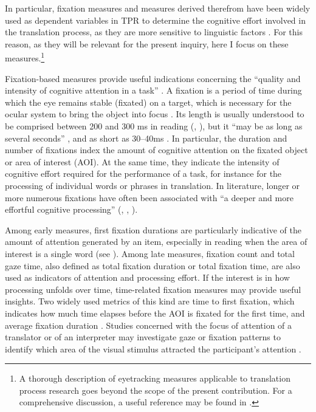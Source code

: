 In particular, fixation measures and measures derived therefrom have been widely used as dependent variables in TPR to determine the cognitive effort involved in the translation process, as they are more sensitive to linguistic factors \citep{gaskell_eye_2007}. For this reason, as they will be relevant for the present inquiry, here I focus on these measures.\footnote{A thorough description of eyetracking measures applicable to translation process research goes beyond the scope of the present contribution. For a comprehensive discussion, a useful reference may be found in \citet{conklin_eye-tracking_2018}.}

Fixation-based measures provide useful indications concerning the ``quality and intensity of cognitive attention in a task'' \citep[402]{jakobsen_translation_2020}. A fixation is a period of time during which the eye remains stable (fixated) on a target, which is necessary for the ocular system to bring the object into focus \citep[46]{duchowski_eye_2017}. Its length is usually understood to be comprised between 200 and 300 ms in reading (\citealt[373]{rayner_eye_1998}, \citealt[381]{holmqvist_eye_2011}), but it ``may be as long as several seconds'' \citep{karsh_looking_1983,young_survey_1975}, and as short as 30--40ms \citep[413]{holmqvist_eye_2011}. In particular, the duration and number of fixations index the amount of cognitive attention on the fixated object or area of interest (AOI). At the same time, they indicate the intensity of cognitive effort required for the performance of a task, for instance for the processing of individual words or phrases in translation. In literature, longer or more numerous fixations have often been associated with ``a deeper and more effortful cognitive processing'' (\citealt[413]{holmqvist_eye_2011}, \citealt[212]{hvelplund_eye_2014}, \citealt[1214]{lacruz_pause_2016}).

Among early measures, first fixation durations are particularly indicative of the amount of attention generated by an item, especially in reading when the area of interest is a single word (see \citealt[124]{conklin_eye-tracking_2018}). Among late measures, fixation count and total gaze time, also defined as total fixation duration or total fixation time, are also used as indicators of attention and processing effort. If the interest is in how processing unfolds over time, time-related fixation measures may provide useful insights. Two widely used metrics of this kind are time to first fixation, which indicates how much time elapses before the AOI is fixated for the first time, and average fixation duration \citep[129]{conklin_eye-tracking_2018}. Studies concerned with the focus of attention of a translator or of an interpreter may investigate gaze or fixation patterns to identify which area of the visual stimulus attracted the participant's attention \citep{ehrensberger-dow_cognitive_2020}.

